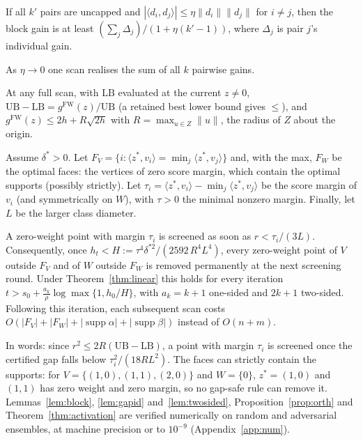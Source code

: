\documentclass{opt2026}   %
\newcommand{\ip}[2]{\langle #1, #2 \rangle}
\newcommand{\norm}[1]{\lVert #1 \rVert}
\newcommand{\gFW}{g^{\mathrm{FW}}}
\newcommand{\UB}{\mathrm{UB}}
\newcommand{\LB}{\mathrm{LB}}
\begin{document}
\begin{proposition}\label{prop:orth}
If all $k'$ pairs are uncapped and
$|\ip{d_i}{d_j}|\le\eta\norm{d_i}\norm{d_j}$ for $i\ne j$, then the
block gain is at least $(\sum_j\Delta_j)/(1+\eta(k'-1))$, where
$\Delta_j$ is pair $j$'s individual gain.
\end{proposition}
As $\eta\to0$ one scan realises the sum of all $k$ pairwise gains.

\begin{lemma}\label{lem:gapid}
At any full scan, with $\LB$ evaluated at the current $z\ne0$,
$\UB-\LB=\gFW(z)/\UB$ (a retained best lower bound gives $\le$), and
$\gFW(z)\le2h+R\sqrt{2h}$ with $R=\max_{u\in Z}\norm u$, the radius of
$Z$ about the origin.
\end{lemma}

\begin{theorem}\label{thm:activation}
Assume $\delta^*>0$. Let $F_V=\{i:\ip{z^*}{v_i}=\min_j\ip{z^*}{v_j}\}$
and, with the max, $F_W$ be the optimal faces: the vertices of zero
score margin, which contain the optimal supports (possibly strictly). Let
$\tau_i=\ip{z^*}{v_i}-\min_j\ip{z^*}{v_j}$ be the score margin of $v_i$
(and symmetrically on $W$), with $\tau>0$ the minimal nonzero margin.
Finally, let $L$ be the larger class diameter.

A zero-weight point with margin $\tau_i$ is screened as soon as
$r<\tau_i/(3L)$. Consequently, once
$h_t<H:=\tau^4\delta^{*2}/(2592\,R^4L^4)$, every zero-weight point of
$V$ outside $F_V$ and of $W$ outside $F_W$ is removed permanently at
the next screening round. Under Theorem~\ref{thm:linear} this holds for
every iteration $t>s_0+\tfrac{a_k}{\rho}\log\max\{1,h_0/H\}$, with
$a_k=k+1$ one-sided and $2k+1$ two-sided.
Following this iteration, each subsequent scan costs
$O(|F_V|+|F_W|+|\operatorname{supp}\alpha|+|\operatorname{supp}\beta|)$
instead of $O(n+m)$.
\end{theorem}
In words: since $r^2\le2R(\UB-\LB)$, a point with margin $\tau_i$ is
screened once the certified gap falls below $\tau_i^2/(18RL^2)$. The
faces can strictly contain the supports: for $V=\{(1,0),(1,1),(2,0)\}$
and $W=\{0\}$, $z^*=(1,0)$ and $(1,1)$ has zero weight and zero margin,
so no gap-safe rule can remove it. 
Lemmas~\ref{lem:block}, \ref{lem:gapid} and~\ref{lem:twosided},
Proposition~\ref{prop:orth} and Theorem~\ref{thm:activation} are
verified numerically on random and adversarial ensembles, at machine
precision or to $10^{-9}$ (Appendix~\ref{app:num}).
\end{document}
